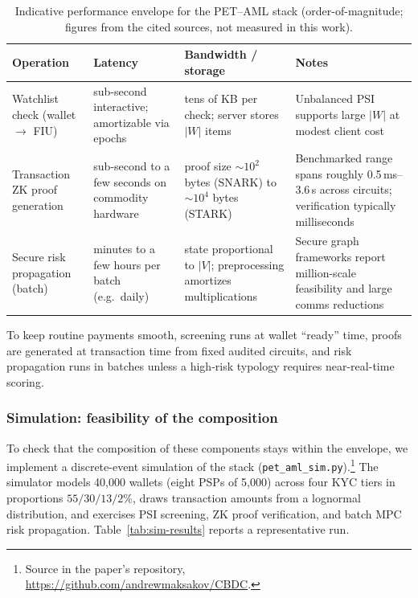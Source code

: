 \documentclass[11pt]{article}
\begin{document}
\begin{table}[H]
\centering
\caption{Indicative performance envelope for the PET--AML stack (order-of-magnitude; figures from the
cited sources, not measured in this work).}
\label{tab:pet-aml-envelope}
\begin{tabular}{p{3.2cm} p{3.2cm} p{3.2cm} p{4.0cm}}
\toprule
\textbf{Operation} & \textbf{Latency} & \textbf{Bandwidth / storage} & \textbf{Notes} \\
\midrule
Watchlist check (wallet $\rightarrow$ FIU) & sub-second interactive; amortizable via epochs & tens of KB per check; server stores $|W|$ items & Unbalanced PSI supports large $|W|$ at modest client cost \citep{Wang2025UnbalancedPSI} \\
\addlinespace
Transaction ZK proof generation & sub-second to a few seconds on commodity hardware & proof size $\sim\!10^2$ bytes (SNARK) to $\sim\!10^4$ bytes (STARK) & Benchmarked range spans roughly 0.5\,ms--3.6\,s across circuits; verification typically milliseconds \citep{ElHajj2024ZKBench} \\
\addlinespace
Secure risk propagation (batch) & minutes to a few hours per batch (e.g.\ daily) & state proportional to $|V|$; preprocessing amortizes multiplications & Secure graph frameworks report million-scale feasibility and large comms reductions \citep{Koti2024Graphiti,Yu2025GraphAce} \\
\bottomrule
\end{tabular}
\end{table}

To keep routine payments smooth, screening runs at wallet ``ready'' time, proofs are generated at
transaction time from fixed audited circuits, and risk propagation runs in batches unless a high-risk
typology requires near-real-time scoring.

\subsubsection{Simulation: feasibility of the composition}
\label{sec:pet-aml-simulation}

To check that the composition of these components stays within the envelope, we implement a
discrete-event simulation of the stack (\texttt{pet\_aml\_sim.py}).\footnote{Source in the paper's
repository, \url{https://github.com/andrewmaksakov/CBDC}.} The simulator models 40{,}000 wallets
(eight PSPs of 5{,}000) across four KYC tiers in proportions $55/30/13/2\%$, draws transaction amounts
from a lognormal distribution, and exercises PSI screening, ZK proof verification, and batch MPC risk
propagation. Table~\ref{tab:sim-results} reports a representative run.
\end{document}
